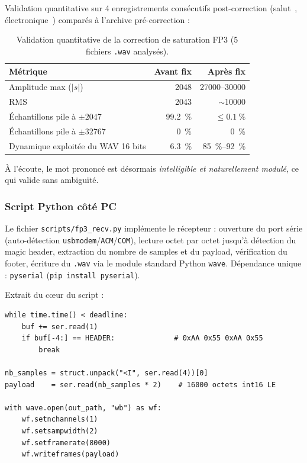 Validation quantitative sur \num{4} enregistrements consécutifs post-correction (\og salut~\fg{}, \og électronique~\fg{}) comparés à l'archive pré-correction :

\begin{table}[H]
\centering
\small
\begin{tabularx}{0.85\linewidth}{@{}X r r@{}}
\toprule
\textbf{Métrique} & \textbf{Avant fix} & \textbf{Après fix} \\
\midrule
Amplitude max (\(\lvert s\rvert\))           & \num{2048}        & \num{27000}--\num{30000} \\
RMS                                          & \num{2043}        & \(\sim\)\num{10000} \\
Échantillons pile à \(\pm 2047\)             & \SI{99.2}{\percent} & \(\leq \SI{0.1}{\percent}\) \\
Échantillons pile à \(\pm 32767\)            & \SI{0}{\percent}  & \SI{0}{\percent} \\
Dynamique exploitée du WAV 16 bits           & \SI{6.3}{\percent} & \SI{85}{\percent}--\SI{92}{\percent} \\
\bottomrule
\end{tabularx}
\caption{Validation quantitative de la correction de saturation FP3 (5 fichiers \texttt{.wav} analysés).}
\label{tab:fp3-saturation-fix}
\end{table}

À l'écoute, le mot prononcé est désormais \emph{intelligible et naturellement modulé}, ce qui valide  sans ambiguïté.

\subsubsection{Script Python côté PC}

Le fichier \verb|scripts/fp3_recv.py| implémente le récepteur : ouverture du port série (auto-détection \texttt{usbmodem}/\texttt{ACM}/\texttt{COM}), lecture octet par octet jusqu'à détection du magic header, extraction du nombre de samples et du payload, vérification du footer, écriture du \verb|.wav| via le module standard Python \verb|wave|. Dépendance unique : \verb|pyserial| (\verb|pip install pyserial|).

Extrait du cœur du script :

\begin{lstlisting}[style=py, caption={Noyau du parser série \texttt{fp3\_recv.py}.}]
while time.time() < deadline:
    buf += ser.read(1)
    if buf[-4:] == HEADER:              # 0xAA 0x55 0xAA 0x55
        break

nb_samples = struct.unpack("<I", ser.read(4))[0]
payload    = ser.read(nb_samples * 2)    # 16000 octets int16 LE

with wave.open(out_path, "wb") as wf:
    wf.setnchannels(1)
    wf.setsampwidth(2)
    wf.setframerate(8000)
    wf.writeframes(payload)
\end{lstlisting}

